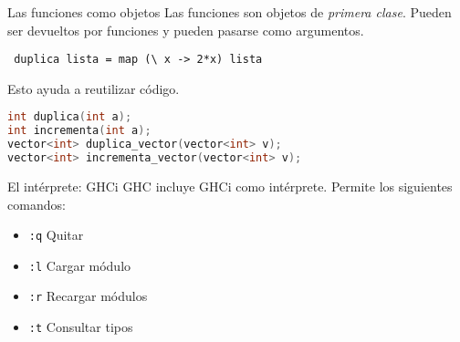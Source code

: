 \begin{frame}[fragile]{Las funciones como objetos}
 Las funciones son objetos de \textit{primera clase}. Pueden ser devueltos
 por funciones y pueden pasarse como argumentos.

 \begin{lstlisting}
 duplica lista = map (\ x -> 2*x) lista
 \end{lstlisting}

 Esto ayuda a reutilizar código.
 \begin{lstlisting}[language=C++]
int duplica(int a);
int incrementa(int a);
vector<int> duplica_vector(vector<int> v);
vector<int> incrementa_vector(vector<int> v);
 \end{lstlisting}


\end{frame}

\begin{frame}{El intérprete: GHCi}
  GHC incluye GHCi como intérprete. Permite los siguientes comandos:
  \espacio
  \begin{itemize}
    \item \texttt{:q} \qquad  Quitar
    \item \texttt{:l} \qquad  Cargar módulo
    \item \texttt{:r} \qquad  Recargar módulos
    \item \texttt{:t} \qquad  Consultar tipos
  \end{itemize}

\end{frame}

